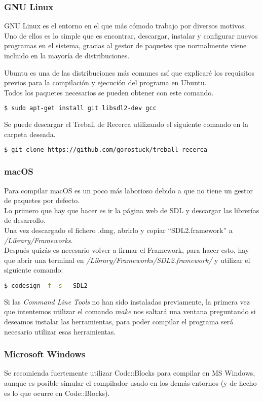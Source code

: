 \subsubsection{GNU Linux}
GNU Linux es el entorno en el que más cómodo trabajo por diversos motivos. Uno de ellos es lo simple que es encontrar, descargar, instalar y configurar nuevos programas en el sistema, gracias al gestor de paquetes que normalmente viene incluido en la mayoría de distribuciones.


Ubuntu es una de las distribuciones más comunes así que explicaré los requisitos previos para la compilación y ejecución del programa en Ubuntu.
\\ Todos los paquetes necesarios se pueden obtener con este comando.
\begin{lstlisting}[language=bash]
  $ sudo apt-get install git libsdl2-dev gcc
\end{lstlisting}
Se puede descargar el Treball de Recerca utilizando el siguiente comando en la carpeta deseada.
\begin{lstlisting}[language=bash]
  $ git clone https://github.com/gorostuck/treball-recerca
\end{lstlisting}

\subsubsection{macOS}
Para compilar macOS es un poco más laborioso debido a que no tiene un gestor de paquetes por defecto.
\\ Lo primero que hay que hacer es ir la página web de SDL y descargar las librerías de desarrollo.
\\ Una vez descargado el fichero .dmg, abrirlo y copiar ``SDL2.framework'' a \textit{/Library/Frameworks}.
\\ Después quizás es necesario volver a firmar el Framework, para hacer esto, hay que abrir una terminal en \textit{/Library/Frameworks/SDL2.framework/} y utilizar el siguiente comando:
\begin{lstlisting}[language=bash]
  $ codesign -f -s - SDL2
\end{lstlisting}
Si las \textit{Command Line Tools} no han sido instaladas previamente, la primera vez que intentemos utilizar el comando \textit{make} nos saltará una ventana preguntando si deseamos instalar las herramientas, para poder compilar el programa será necesario utilizar esas herramientas.

\subsubsection{Microsoft Windows}
Se recomienda fuertemente utilizar Code::Blocks para compilar en MS Windows, aunque es posible simular el compilador usado en los demás entornos (y de hecho es lo que ocurre en Code::Blocks).

